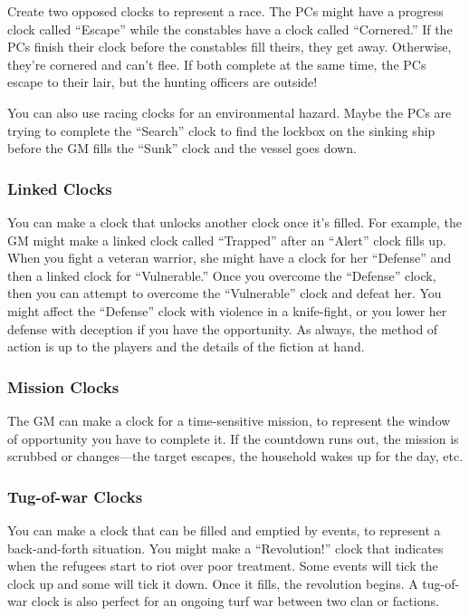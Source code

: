 Create two opposed clocks to represent a race. The PCs might have a progress clock called ``Escape'' while the constables have a clock called ``Cornered.'' If the PCs finish their clock before the constables fill theirs, they get away. Otherwise, they’re cornered and can’t flee. If both complete at the same time, the PCs escape to their lair, but the hunting officers are outside!

You can also use racing clocks for an environmental hazard. Maybe the PCs are trying to complete the ``Search'' clock to find the lockbox on the sinking ship before the GM fills the ``Sunk'' clock and the vessel goes down.

\subsubsection{Linked Clocks}

You can make a clock that unlocks another clock once it’s filled. For example, the GM might make a linked clock called ``Trapped'' after an ``Alert'' clock fills up. When you fight a veteran warrior, she might have a clock for her ``Defense'' and then a linked clock for ``Vulnerable.'' Once you overcome the ``Defense'' clock, then you can attempt to overcome the ``Vulnerable'' clock and defeat her. You might affect the ``Defense'' clock with violence in a knife-fight, or you lower her defense with deception if you have the opportunity. As always, the method of action is up to the players and the details of the fiction at hand.

\subsubsection{Mission Clocks}

The GM can make a clock for a time-sensitive mission, to represent the window of opportunity you have to complete it. If the countdown runs out, the mission is scrubbed or changes—the target escapes, the household wakes up for the day, etc.

\subsubsection{Tug-of-war Clocks}

You can make a clock that can be filled and emptied by events, to represent a back-and-forth situation. You might make a ``Revolution!'' clock that indicates when the refugees start to riot over poor treatment. Some events will tick the clock up and some will tick it down. Once it fills, the revolution begins. A tug-of-war clock is also perfect for an ongoing turf war between two clan or factions.

